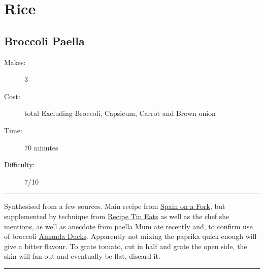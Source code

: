 \documentclass[]{article}
\begin{document}
\section*{\center\Huge\color{accent}Rice}
\label{cat:Rice}
\label{rec:Broccoli Paella}
\subsection*{\center\huge Broccoli Paella}
\begin{description}
\item[Makes:] 3 
\item[Cost:]  total Excluding Broccoli, Capsicum, Carrot and Brown onion
\item[Time:] 70 minutes
\item[Difficulty:] 7/10
\end{description}
\vspace{0.2cm}\hrule\vspace{0.5cm}
\begin{adjustwidth}{0.5 cm}{0.5 cm}

Synthesised from a few sources. Main recipe from \href{https://spainonafork.com/authentic-spanish-vegetable-paella-recipe/}{Spain on a Fork}, but supplemented by technique from \href{https://www.recipetineats.com/spanish-paella/}{Recipe Tin Eats} as well as the chef she mentions, as well as anecdote from paella Mum ate recently and, to confirm use of broccoli \href{https://www.amandaducks.com/recipes/capsicum-paella}{Amanda Ducks}. Apparently not mixing the paprika quick enough will give a bitter flavour. To grate tomato, cut in half and grate the open side, the skin will fan out and eventually be flat, discard it. \hfill{}\color{black}

\end{adjustwidth}
\vspace{0.5cm}\hrule
\end{document}
